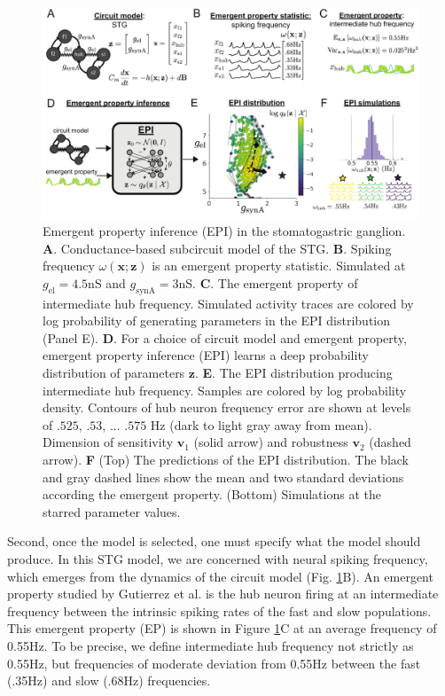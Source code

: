 \documentclass[11pt]{article}
\begin{document}
\begin{figure}
\begin{center}
\includegraphics[scale=0.8]{figures/fig1/fig1.pdf}
\end{center}
\caption{Emergent property inference (EPI) in the stomatogastric ganglion.  
\textbf{A}. Conductance-based subcircuit model of the STG.
\textbf{B}. Spiking frequency $\omega(\mathbf{x}; \mathbf{z})$ is an emergent property statistic. 
Simulated at $g_{\text{el}} = 4.5$nS and $g_{\text{synA}} = 3$nS.
\textbf{C}. The emergent property of intermediate hub frequency.
Simulated activity traces are colored by log probability of generating parameters in the EPI distribution (Panel E).
\textbf{D}. For a choice of circuit model and emergent property, emergent property inference (EPI) learns a deep probability distribution of parameters $\mathbf{z}$.
\textbf{E}. The EPI distribution producing intermediate hub frequency.
Samples are colored by log probability density.  
Contours of hub neuron frequency error are shown at levels of $.525$, $.53$, ... $.575$ Hz (dark to light gray away from mean).
Dimension of sensitivity $\mathbf{v}_1$ (solid arrow) and robustness $\mathbf{v}_2$ (dashed arrow).
\textbf{F} (Top) The predictions of the EPI distribution.
The black and gray dashed lines show the mean and two standard deviations according the emergent property.
(Bottom) Simulations at the starred parameter values.
 }
 \label{fig:STG}
\end{figure}

Second, once the model is selected, one must specify what the model should produce.
In this STG model, we are concerned with neural spiking frequency, which emerges from the dynamics of the circuit model (Fig. \ref{fig:STG}B).
An emergent property studied by Gutierrez et al. is the hub neuron firing at an intermediate frequency between the intrinsic spiking rates of the fast and slow populations.
This emergent property (EP) is shown in Figure \ref{fig:STG}C at an average frequency of 0.55Hz.
To be precise, we define intermediate hub frequency not strictly as 0.55Hz, but frequencies of moderate deviation from 0.55Hz between the fast (.35Hz) and slow (.68Hz) frequencies.
\end{document}
